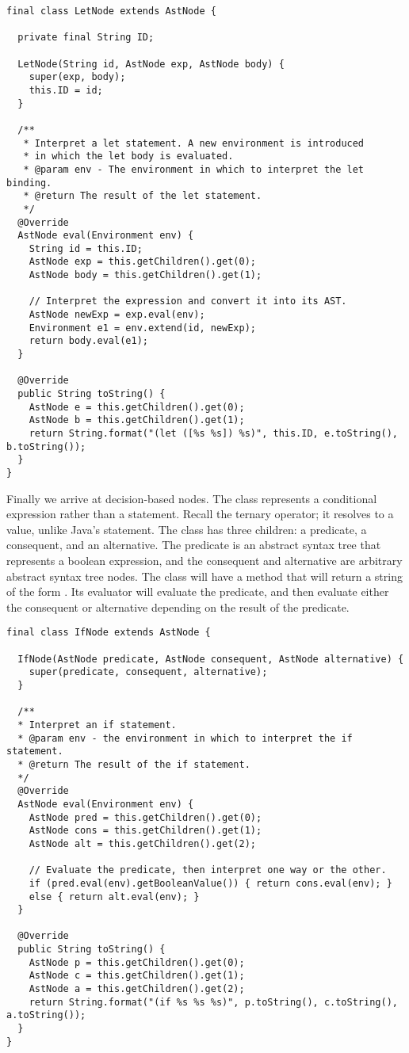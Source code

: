 \begin{lstlisting}[language=MyJava]
final class LetNode extends AstNode {

  private final String ID;

  LetNode(String id, AstNode exp, AstNode body) {
    super(exp, body);
    this.ID = id;
  }

  /**
   * Interpret a let statement. A new environment is introduced 
   * in which the let body is evaluated.
   * @param env - The environment in which to interpret the let binding.
   * @return The result of the let statement.
   */
  @Override
  AstNode eval(Environment env) {
    String id = this.ID;
    AstNode exp = this.getChildren().get(0);
    AstNode body = this.getChildren().get(1);

    // Interpret the expression and convert it into its AST.
    AstNode newExp = exp.eval(env);
    Environment e1 = env.extend(id, newExp);
    return body.eval(e1);
  }

  @Override
  public String toString() {
    AstNode e = this.getChildren().get(0);
    AstNode b = this.getChildren().get(1);
    return String.format("(let ([%s %s]) %s)", this.ID, e.toString(), b.toString());
  }
}
\end{lstlisting}

Finally we arrive at decision-based nodes. The  class represents a conditional expression rather than a statement. Recall the ternary operator; it resolves to a value, unlike Java's  statement. The  class has three children: a predicate, a consequent, and an alternative. The predicate is an abstract syntax tree that represents a boolean expression, and the consequent and alternative are arbitrary abstract syntax tree nodes. The  class will have a  method that will return a string of the form . Its evaluator will evaluate the predicate, and then evaluate either the consequent or alternative depending on the result of the predicate.

\begin{lstlisting}[language=MyJava]
final class IfNode extends AstNode {
  
  IfNode(AstNode predicate, AstNode consequent, AstNode alternative) {
    super(predicate, consequent, alternative);
  }

  /**
  * Interpret an if statement.
  * @param env - the environment in which to interpret the if statement.
  * @return The result of the if statement.
  */
  @Override
  AstNode eval(Environment env) {
    AstNode pred = this.getChildren().get(0);
    AstNode cons = this.getChildren().get(1);
    AstNode alt = this.getChildren().get(2);

    // Evaluate the predicate, then interpret one way or the other.
    if (pred.eval(env).getBooleanValue()) { return cons.eval(env); } 
    else { return alt.eval(env); }
  }
  
  @Override
  public String toString() {
    AstNode p = this.getChildren().get(0);
    AstNode c = this.getChildren().get(1);
    AstNode a = this.getChildren().get(2);
    return String.format("(if %s %s %s)", p.toString(), c.toString(), a.toString());
  }
}
\end{lstlisting}

